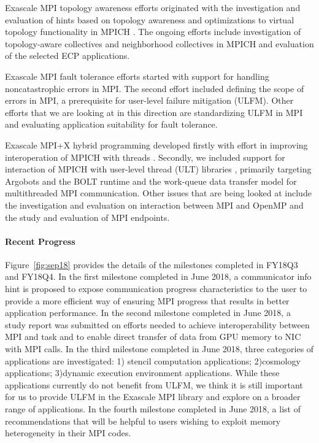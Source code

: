 Exascale MPI topology awareness efforts \cite{Topo1,Topo2} originated
with the investigation and evaluation of hints based on topology
awareness and optimizations to virtual topology functionality in MPICH
\cite{topo-io,topo-io2}.  The ongoing efforts include investigation of
topology-aware collectives and neighborhood collectives in MPICH
\cite{coll} and evaluation of the selected ECP applications.

Exascale MPI fault tolerance efforts \cite{FT1, FT2} started with
support for handling noncatastrophic errors in MPI.  The second effort
included defining the scope of errors in MPI, a prerequisite for
user-level failure mitigation (ULFM).  Other efforts that we are
looking at in this direction are standardizing ULFM in MPI and
evaluating application suitability for fault tolerance.

Exascale MPI+X hybrid programming developed firstly with effort in
improving interoperation of MPICH with threads \cite{interthread}.
Secondly, we included support for interaction of MPICH with user-level
thread (ULT) libraries \cite{ULT}, primarily targeting Argobots and
the BOLT runtime and the work-queue data transfer model for
multithreaded MPI communication.  Other issues that are being looked
at include the investigation and evaluation on interaction between MPI
and OpenMP and the study and evaluation of MPI endpoints.


\paragraph{Recent Progress}

Figure~\ref{fig:sep18} provides the details of the milestones completed in FY18Q3 and FY18Q4.
In the first milestone completed in June 2018, a communicator info hint is proposed to expose
communication progress characteristics to the user to provide a more efficient way of ensuring
MPI progress that results in better application  performance.
In the second milestone completed in June 2018, a study report was submitted on efforts needed to
achieve interoperability between MPI and task and to enable direct transfer of data from
GPU memory to NIC with MPI calls.
In the third milestone completed in June 2018, three categories of applications are investigated: 1)
stencil computation applications; 2)cosmology applications;  3)dynamic  execution  environment  applications.
While these applications currently do
not benefit from ULFM, we think it is still important for us to provide ULFM in the Exascale
MPI library and explore on a broader range of applications.
In the fourth milestone completed in June 2018, a list of recommendations that will be
helpful to users wishing to exploit memory heterogeneity \cite{hetero4} in their MPI codes.

